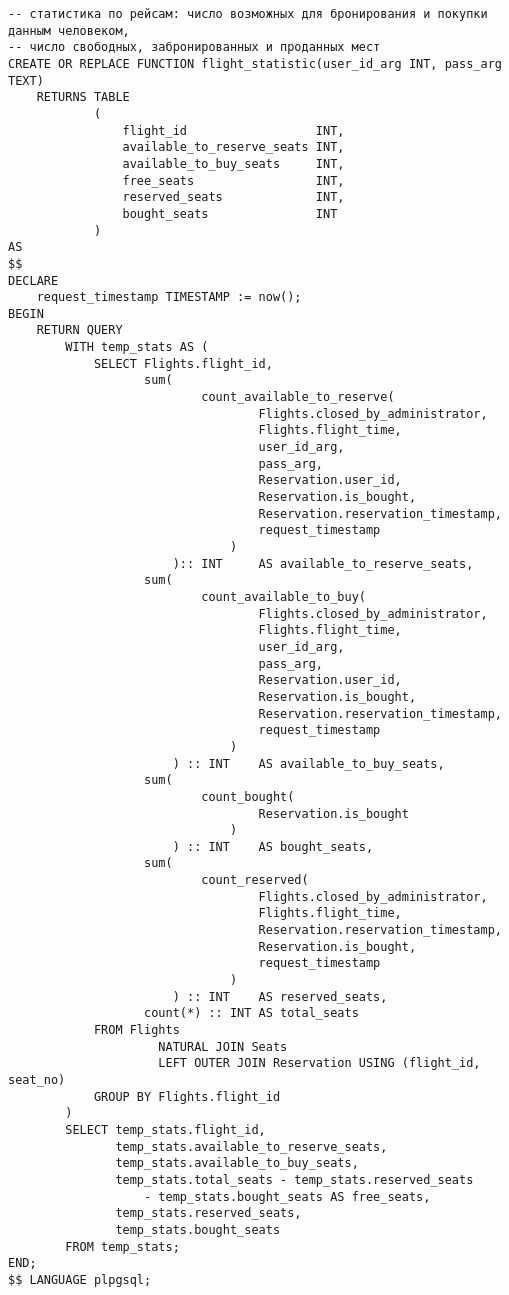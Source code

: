 \documentclass{article}
\begin{document}
\begin{verbatim}
-- статистика по рейсам: число возможных для бронирования и покупки данным человеком,
-- число свободных, забронированных и проданных мест
CREATE OR REPLACE FUNCTION flight_statistic(user_id_arg INT, pass_arg TEXT)
    RETURNS TABLE
            (
                flight_id                  INT,
                available_to_reserve_seats INT,
                available_to_buy_seats     INT,
                free_seats                 INT,
                reserved_seats             INT,
                bought_seats               INT
            )
AS
$$
DECLARE
    request_timestamp TIMESTAMP := now();
BEGIN
    RETURN QUERY
        WITH temp_stats AS (
            SELECT Flights.flight_id,
                   sum(
                           count_available_to_reserve(
                                   Flights.closed_by_administrator,
                                   Flights.flight_time,
                                   user_id_arg,
                                   pass_arg,
                                   Reservation.user_id,
                                   Reservation.is_bought,
                                   Reservation.reservation_timestamp,
                                   request_timestamp
                               )
                       ):: INT     AS available_to_reserve_seats,
                   sum(
                           count_available_to_buy(
                                   Flights.closed_by_administrator,
                                   Flights.flight_time,
                                   user_id_arg,
                                   pass_arg,
                                   Reservation.user_id,
                                   Reservation.is_bought,
                                   Reservation.reservation_timestamp,
                                   request_timestamp
                               )
                       ) :: INT    AS available_to_buy_seats,
                   sum(
                           count_bought(
                                   Reservation.is_bought
                               )
                       ) :: INT    AS bought_seats,
                   sum(
                           count_reserved(
                                   Flights.closed_by_administrator,
                                   Flights.flight_time,
                                   Reservation.reservation_timestamp,
                                   Reservation.is_bought,
                                   request_timestamp
                               )
                       ) :: INT    AS reserved_seats,
                   count(*) :: INT AS total_seats
            FROM Flights
                     NATURAL JOIN Seats
                     LEFT OUTER JOIN Reservation USING (flight_id, seat_no)
            GROUP BY Flights.flight_id
        )
        SELECT temp_stats.flight_id,
               temp_stats.available_to_reserve_seats,
               temp_stats.available_to_buy_seats,
               temp_stats.total_seats - temp_stats.reserved_seats
                   - temp_stats.bought_seats AS free_seats,
               temp_stats.reserved_seats,
               temp_stats.bought_seats
        FROM temp_stats;
END;
$$ LANGUAGE plpgsql;
\end{verbatim}
\end{document}
